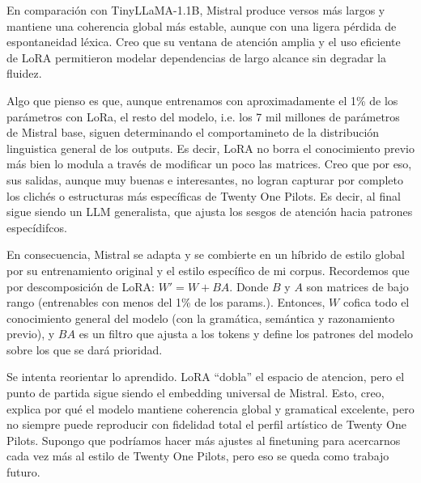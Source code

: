 En comparación con TinyLLaMA-1.1B, Mistral produce versos más largos y mantiene una coherencia 
global más estable, aunque con una ligera pérdida de espontaneidad léxica. Creo que su ventana
de atención amplia y el uso eficiente de LoRA permitieron modelar dependencias de largo alcance
sin degradar la fluidez. 

Algo que pienso es que, aunque entrenamos con aproximadamente el 1\% de los parámetros con LoRa, el resto del
modelo, i.e. los 7 mil millones de parámetros de Mistral base, siguen determinando el comportamineto
de la distribución linguistica general de los outputs. Es decir, LoRA no borra el conocimiento previo
más bien lo modula a través de modificar un poco las matrices. Creo que por eso, sus salidas, aunque 
muy buenas e interesantes, no logran capturar por completo los clichés o estructuras más específicas
de Twenty One Pilots. Es decir, al final sigue siendo un LLM generalista, que ajusta los sesgos
de atención hacia patrones especídifcos. 

En consecuencia, Mistral se adapta y se combierte en un híbrido de estilo global por su entrenamiento
original y el estilo específico de mi corpus. Recordemos que por descomposición de LoRA: $W' = W + BA$.
Donde $B$ y $A$ son matrices de bajo rango (entrenables con menos del 1\% de los params.). Entonces, $W$
cofica todo el conocimiento general del modelo (con la gramática, semántica y razonamiento previo), y 
$BA$ es un filtro que ajusta a los tokens y define los patrones del modelo sobre los que se dará prioridad.

Se intenta reorientar lo aprendido. LoRA ``dobla'' el espacio de atencion, pero el punto de partida 
sigue siendo el embedding universal de Mistral. Esto, creo, explica por qué el modelo mantiene coherencia 
global y gramatical excelente, pero no siempre puede reproducir con fidelidad total el perfil 
artístico de Twenty One Pilots. Supongo que podríamos hacer más ajustes al finetuning para 
acercarnos cada vez más al estilo de Twenty One Pilots, pero eso se queda como trabajo futuro.



\clearpage